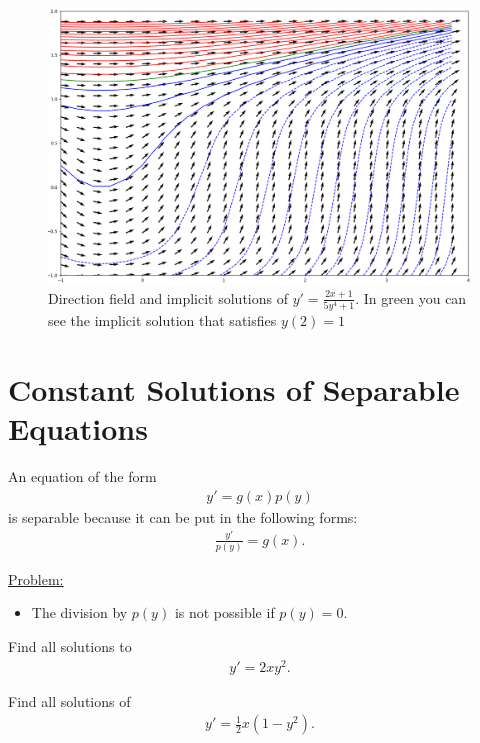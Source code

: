 \documentclass[12pt,a4paper]{article}
\newcounter{example}[section]
\begin{document}
\begin{figure}[h]
\centering
\includegraphics[scale=0.36]{Fig222.png}
\caption{Direction field and implicit solutions of $y' = \frac{2x + 1}{5y^4 + 1}$. In green you can see the implicit solution that satisfies $y(2) = 1$}
\end{figure}

\newpage

\section{Constant Solutions of Separable Equations}
An equation of the form
	\begin{align*}
	y' = g(x) p(y)
	\end{align*}
is separable because it can be put in the following forms:
	\begin{align*}
	\frac{y'}{p(y)} = g(x) .
	\end{align*}

\underline{Problem:}
	\begin{itemize}
	\item The division by $p(y)$ is not possible if $p(y) = 0$.
	\end{itemize}
	
\vspace*{16pt}
	
\begin{example}
Find all solutions to
	\begin{align*}
	y' = 2xy^2 .
	\end{align*}
\end{example}

\newpage

\begin{example}
Find all solutions of
	\begin{align*}
	y' = \frac{1}{2} x (1 - y^2) .
	\end{align*}
\end{example}

\newpage

\phantom{2}
\end{document}
